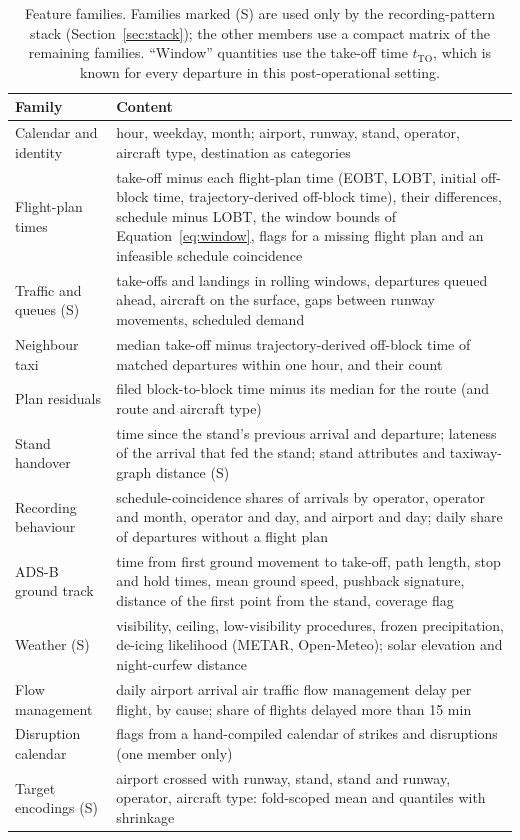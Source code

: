\documentclass[
  manuscript=article,  %
  layout=preprint,  %
  year=20xx,
  volume=x,
]{extra/joas}
\begin{document}
\begin{table}[htbp!]
  \centering
  \small
  \caption{Feature families. Families marked (S) are used only by the recording-pattern stack (Section~\ref{sec:stack}); the other members use a compact matrix of the remaining families. ``Window'' quantities use the take-off time $t_{\mathrm{TO}}$, which is known for every departure in this post-operational setting.}
  \label{tb:features}
  \begin{tabular}{p{}p{}}
  \toprule
  \textbf{Family} & \textbf{Content} \\
  \midrule
  Calendar and identity & hour, weekday, month; airport, runway, stand, operator, aircraft type, destination as categories \\
  Flight-plan times & take-off minus each flight-plan time (EOBT, LOBT, initial off-block time, trajectory-derived off-block time), their differences, schedule minus LOBT, the window bounds of Equation~\eqref{eq:window}, flags for a missing flight plan and an infeasible schedule coincidence \\
  Traffic and queues (S) & take-offs and landings in rolling windows, departures queued ahead, aircraft on the surface, gaps between runway movements, scheduled demand \\
  Neighbour taxi & median take-off minus trajectory-derived off-block time of matched departures within one hour, and their count \\
  Plan residuals & filed block-to-block time minus its median for the route (and route and aircraft type) \\
  Stand handover & time since the stand's previous arrival and departure; lateness of the arrival that fed the stand; stand attributes and taxiway-graph distance (S) \\
  Recording behaviour & schedule-coincidence shares of arrivals by operator, operator and month, operator and day, and airport and day; daily share of departures without a flight plan \\
  ADS-B ground track & time from first ground movement to take-off, path length, stop and hold times, mean ground speed, pushback signature, distance of the first point from the stand, coverage flag \\
  Weather (S) & visibility, ceiling, low-visibility procedures, frozen precipitation, de-icing likelihood (METAR, Open-Meteo); solar elevation and night-curfew distance \\
  Flow management & daily airport arrival air traffic flow management delay per flight, by cause; share of flights delayed more than 15 min \\
  Disruption calendar & flags from a hand-compiled calendar of strikes and disruptions (one member only) \\
  Target encodings (S) & airport crossed with runway, stand, stand and runway, operator, aircraft type: fold-scoped mean and quantiles with shrinkage \\
  \bottomrule
  \end{tabular}
\end{table}
\end{document}
